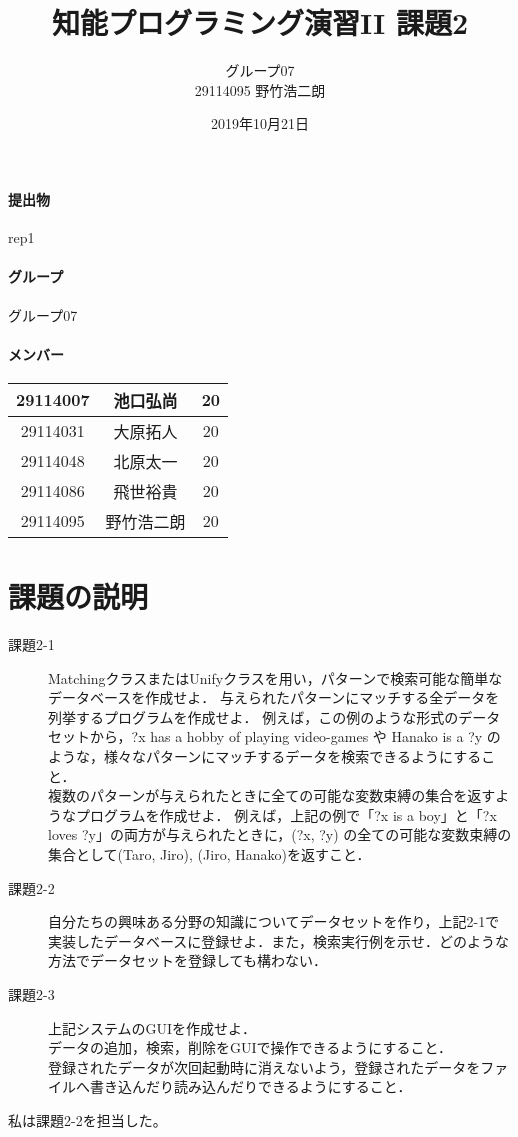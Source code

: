\documentclass[a4j]{jarticle}
\title{知能プログラミング演習II 課題2}
\author{グループ07\\
  29114095 野竹浩二朗\\
}
\date{2019年10月21日}
\begin{document}
\maketitle

\paragraph{提出物} rep1
\paragraph{グループ} グループ07
\paragraph{メンバー}
\begin{tabular}{|c|c|c|}
  \hline\hline
  29114007&池口弘尚&20\\
  \hline
  29114031&大原拓人&20\\
  \hline
  29114048&北原太一&20\\
  \hline
  29114086&飛世裕貴&20\\
  \hline
  29114095&野竹浩二朗&20\\
\end{tabular}



\section{課題の説明}
\begin{description}
\item[課題2-1] MatchingクラスまたはUnifyクラスを用い，パターンで検索可能な簡単なデータベースを作成せよ．
与えられたパターンにマッチする全データを列挙するプログラムを作成せよ．
例えば，この例のような形式のデータセットから，?x has a hobby of playing video-games や Hanako is a ?y のような，様々なパターンにマッチするデータを検索できるようにすること．\\
複数のパターンが与えられたときに全ての可能な変数束縛の集合を返すようなプログラムを作成せよ．
例えば，上記の例で「?x is a boy」と「?x loves ?y」の両方が与えられたときに，(?x, ?y) の全ての可能な変数束縛の集合として{(Taro, Jiro), (Jiro, Hanako)}を返すこと．
	
\item[課題2-2] 自分たちの興味ある分野の知識についてデータセットを作り，上記2-1で実装したデータベースに登録せよ．また，検索実行例を示せ．どのような方法でデータセットを登録しても構わない．

\item[課題2-3] 上記システムのGUIを作成せよ．\\
データの追加，検索，削除をGUIで操作できるようにすること．\\
登録されたデータが次回起動時に消えないよう，登録されたデータをファイルへ書き込んだり読み込んだりできるようにすること．
\end{description}
私は課題2-2を担当した。
\end{document}
